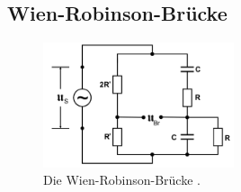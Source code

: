 \subsection{Wien-Robinson-Brücke}

\begin{figure}
    \centering
    \includegraphics[width=0.5\textwidth]{pictures/Schaltung6.png}
    \caption{Die Wien-Robinson-Brücke \cite[8]{v302}.}
    \label{fig:Schaltung6}
\end{figure}

